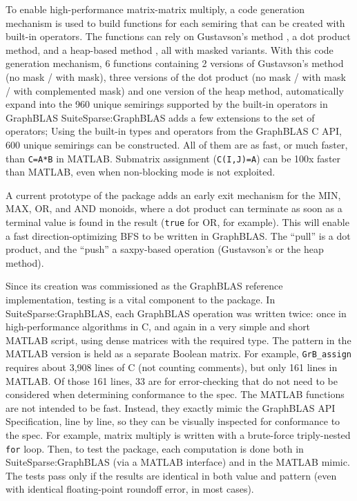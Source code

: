 To enable high-performance matrix-matrix multiply, a code generation mechanism
is used to build functions for each semiring that can be created with built-in
operators.  The functions can rely on Gustavson's method \cite{Gustavson78}, a
dot product method, and a heap-based method \cite{sisc3dspgemm}, all with
masked variants.  With this code generation mechanism, 6 functions
containing 2 versions of Gustavson's method (no mask / with mask),
three versions of the dot product (no mask / with mask / with complemented
mask) and one version of the heap method, automatically expand into the 960
unique semirings supported by the built-in operators in GraphBLAS
SuiteSparse:GraphBLAS adds a few extensions to the set of operators;
Using the  built-in types and operators from the GraphBLAS C API,
600 unique semirings can be constructed.  All of them are as fast, or much
faster, than \verb'C=A*B' in MATLAB.  Submatrix assignment (\verb'C(I,J)=A')
can be 100x faster than MATLAB, even when non-blocking mode is not exploited.

A current prototype of the package adds an early exit
mechanism for the MIN, MAX, OR, and AND monoids, where a dot product can
terminate as soon as a terminal value is found in the result (\verb'true' for
OR, for example).  This will enable a fast direction-optimizing BFS
\cite{Beamer:2012:DOB} to be written in GraphBLAS.  The ``pull'' is a dot
product, and the ``push'' a saxpy-based operation (Gustavson's or the heap
method).

Since its creation was commissioned as the GraphBLAS reference implementation,
testing is a vital component to the package.  In SuiteSparse:GraphBLAS, each
GraphBLAS operation was written twice: once in high-performance algorithms in
C, and again in a very simple and short MATLAB script, using dense matrices
with the required type.  The pattern in the MATLAB version is held as a
separate Boolean matrix.  For example, \verb'GrB_assign' requires about 3,908
lines of C (not counting comments), but only 161 lines in MATLAB. Of those 161
lines, 33 are for error-checking that do not need to be considered when
determining conformance to the spec.  The MATLAB functions are not intended to
be fast.  Instead, they exactly mimic the GraphBLAS API Specification, line by
line, so they can be visually inspected for conformance to the spec.  For
example, matrix multiply is written with a brute-force triply-nested \verb'for'
loop.  Then, to test the package, each computation is done both in
SuiteSparse:GraphBLAS (via a MATLAB interface) and in the MATLAB mimic.  The
tests pass only if the results are identical in both value and pattern (even
with identical floating-point roundoff error, in most cases).

